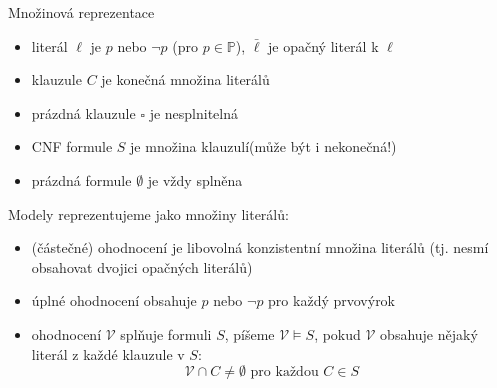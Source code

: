 \documentclass{beamer}
\begin{document}
\begin{frame}{Množinová reprezentace}

    \begin{itemize}
        \item \alert{literál} $\ell$ je $p$ nebo $\neg p$ (pro $p\in\mathbb P$), $\bar \ell$ je \alert{opačný literál} k $\ell$\pause
        \item \alert{klauzule} $C$ je konečná množina literálů\pause
        \item \alert{prázdná klauzule} $\square$ je nesplnitelná\pause
        \item \alert{CNF formule} $S$ je množina klauzulí\pause (může být i \alert{nekonečná}!)\pause
        \item \alert{prázdná formule} $\emptyset$ je vždy splněna
    \end{itemize}\pause
    Modely reprezentujeme jako množiny literálů:\pause
    \begin{itemize}
        \item \alert{(částečné) ohodnocení} je libovolná \alert{konzistentní} množina literálů (tj. nesmí obsahovat dvojici opačných literálů) \pause
        \item\alert{úplné ohodnocení} obsahuje $p$ nebo $\neg p$ pro každý prvovýrok\pause
        \item ohodnocení $\mathcal V$ \alert{splňuje} formuli $S$, píšeme \alert{$\mathcal V\models S$}, pokud $\mathcal V$ obsahuje nějaký literál z každé klauzule v $S$:\pause
        $$
        \mathcal V\cap C\neq\emptyset\text{ pro každou }C\in S
        $$
    \end{itemize}

\end{frame}
\end{document}
